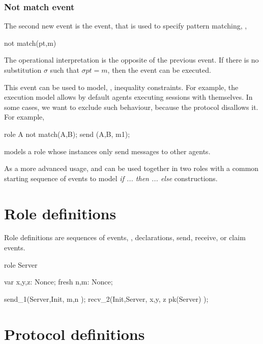 \documentclass{book}
\begin{document}
\subsubsection[Not match event]{Not match event}

The second new event is the  event, that is used to specify
pattern matching, \ie,
\begin{spdl}
  not match(pt,m)
\end{spdl}
The operational interpretation is the opposite of the previous event. If
there is no substitution $\sigma$ such that $\sigma pt = m$, then the
event can be executed.

This event can be used to model, \eg, inequality constraints. For
example, the execution model allows by default agents executing
sessions with themselves. In some cases, we want to exclude such
behaviour, because the protocol disallows it. For example,
\begin{spdl}
  role A {
    not match(A,B);
    send (A,B, m1);
  }
\end{spdl}
models a role whose instances only send messages to other agents.

As a more advanced usage,  and  can be used
together in two roles with a common starting sequence of events to model
\emph{if ... then ... else} constructions. 

\section{Role definitions}

Role definitions are sequences of events, \ie, declarations, send,
receive, or claim events.

\begin{spdl}
role Server {
  var x,y,z: Nonce;
  fresh n,m: Nonce;

  send_1(Server,Init, m,n );
  recv_2(Init,Server, x,y, { z }pk(Server) );
}
\end{spdl}

\section{Protocol definitions}
\end{document}
